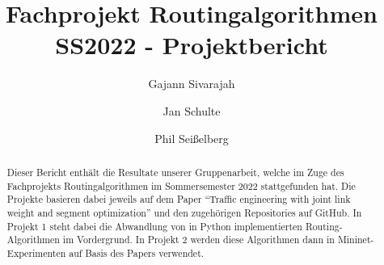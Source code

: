 \documentclass[sigconf,noacm,review]{acmart}
\begin{document}
\title{Fachprojekt Routingalgorithmen SS2022 - Projektbericht}


\author{Gajann Sivarajah}
\author{Jan Schulte}
\author{Phil Seißelberg}



\begin{abstract}
  Dieser Bericht enthält die Resultate unserer Gruppenarbeit, welche im Zuge des 
  Fachprojekts Routingalgorithmen im Sommersemester 2022 stattgefunden hat. 
  Die Projekte basieren dabei jeweils auf dem Paper ``Traffic engineering with joint link
  weight and segment optimization'' \cite[1]{originPaper} und den zugehörigen Repositories auf GitHub.
  In Projekt 1 steht dabei die Abwandlung von in Python implementierten Routing-Algorithmen
  im Vordergrund. In Projekt 2 werden diese Algorithmen dann in Mininet-Experimenten auf Basis
  des Papers verwendet.
  \end{abstract}

\end{document}
